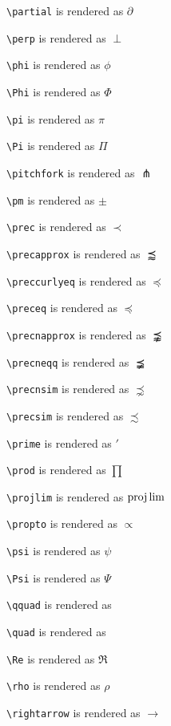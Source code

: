 \texttt{\textbackslash partial} is rendered as $\partial$


\texttt{\textbackslash perp} is rendered as $\perp$


\texttt{\textbackslash phi} is rendered as $\phi$


\texttt{\textbackslash Phi} is rendered as $\Phi$


\texttt{\textbackslash pi} is rendered as $\pi$


\texttt{\textbackslash Pi} is rendered as $\Pi$


\texttt{\textbackslash pitchfork} is rendered as $\pitchfork$


\texttt{\textbackslash pm} is rendered as $\pm$


\texttt{\textbackslash prec} is rendered as $\prec$


\texttt{\textbackslash precapprox} is rendered as $\precapprox$


\texttt{\textbackslash preccurlyeq} is rendered as $\preccurlyeq$


\texttt{\textbackslash preceq} is rendered as $\preceq$


\texttt{\textbackslash precnapprox} is rendered as $\precnapprox$


\texttt{\textbackslash precneqq} is rendered as $\precneqq$


\texttt{\textbackslash precnsim} is rendered as $\precnsim$


\texttt{\textbackslash precsim} is rendered as $\precsim$


\texttt{\textbackslash prime} is rendered as $\prime$


\texttt{\textbackslash prod} is rendered as $\prod$


\texttt{\textbackslash projlim} is rendered as $\projlim$


\texttt{\textbackslash propto} is rendered as $\propto$


\texttt{\textbackslash psi} is rendered as $\psi$


\texttt{\textbackslash Psi} is rendered as $\Psi$


\texttt{\textbackslash qquad} is rendered as $\qquad$


\texttt{\textbackslash quad} is rendered as $\quad$


\texttt{\textbackslash Re} is rendered as $\Re$


\texttt{\textbackslash rho} is rendered as $\rho$


\texttt{\textbackslash rightarrow} is rendered as $\rightarrow$


